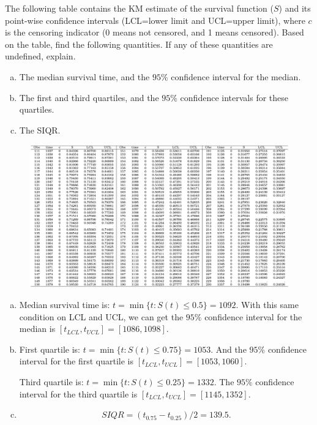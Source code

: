 \documentclass[12pt]{elegantbook}
\begin{document}
    \begin{exercise*}[4]
        The following table contains the KM estimate of the survival function ($S$) and its point-wise confidence intervals (LCL=lower limit and UCL=upper limit), where $c$ is the censoring indicator (0 means not censored, and 1 means censored). Based on the table, find the following quantities. If any of these quantities are undefined, explain. 
        \begin{enumerate}[(a)]
            \item The median survival time, and the $95\%$ confidence interval for the median.
            \item The first and third quartiles, and the $95\%$ confidence intervals for these quartiles.
            \item The SIQR. 
        \end{enumerate}
        \begin{figure}[H]
            \centering
            \includegraphics[width=\textwidth]{HW1_4.png}
        \end{figure}
    \end{exercise*}
    \begin{solution}
        \begin{enumerate}[(a)]
            \item Median survival time is: $t=\min\{t:S(t)\leq0.5\}=1092$. With this same condition on LCL and UCL, we can get the $95\%$ confidence interval for the median is $[t_{LCL},t_{UCL}]=[1086,1098]$. 
            \item First quartile is: $t=\min\{t:S(t)\leq0.75\}=1053$. And the $95\%$ confidence interval for the first quartile is $[t_{LCL},t_{UCL}]=[1053,1060]$. 
            
            Third quartile is: $t=\min\{t:S(t)\leq0.25\}=1332$. The $95\%$ confidence interval for the third quartile is $[t_{LCL},t_{UCL}]=[1145,1352]$. 
            \item \[SIQR=(t_{0.75}-t_{0.25})/2=139.5. \]
        \end{enumerate}
    \end{solution}
\end{document}
